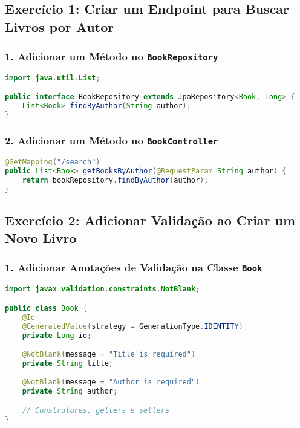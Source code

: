 \documentclass[a4paper,12pt]{book}
\begin{document}
\subsection{Exercício 1: Criar um Endpoint para Buscar Livros por Autor}

\subsubsection{1. Adicionar um Método no \texttt{BookRepository}}

\begin{lstlisting}[language=Java, caption={Método no Repositório}]
import java.util.List;

public interface BookRepository extends JpaRepository<Book, Long> {
    List<Book> findByAuthor(String author);
}
\end{lstlisting}

\subsubsection{2. Adicionar um Método no \texttt{BookController}}

\begin{lstlisting}[language=Java, caption={Método no Controlador}]
@GetMapping("/search")
public List<Book> getBooksByAuthor(@RequestParam String author) {
    return bookRepository.findByAuthor(author);
}
\end{lstlisting}

\subsection{Exercício 2: Adicionar Validação ao Criar um Novo Livro}

\subsubsection{1. Adicionar Anotações de Validação na Classe \texttt{Book}}

\begin{lstlisting}[language=Java, caption={Validação na Classe Book}]
import javax.validation.constraints.NotBlank;

public class Book {
    @Id
    @GeneratedValue(strategy = GenerationType.IDENTITY)
    private Long id;

    @NotBlank(message = "Title is required")
    private String title;

    @NotBlank(message = "Author is required")
    private String author;

    // Construtores, getters e setters
}
\end{lstlisting}
\end{document}
